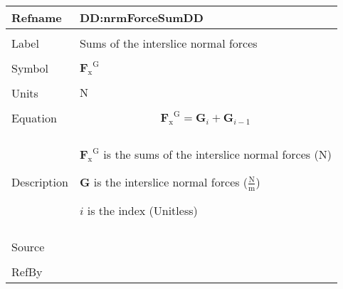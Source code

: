 \documentclass[12pt]{article}
\begin{document}
\vspace{\baselineskip}
\noindent
\begin{minipage}{\textwidth}
\begin{tabular}{>{\raggedright}p{}>{\raggedright\arraybackslash}p{}}
\toprule \textbf{Refname} & \textbf{DD:nrmForceSumDD}
\label{DD:nrmForceSumDD}
\\ \midrule \\
Label & Sums of the interslice normal forces
        
\\ \midrule \\
Symbol & ${{\symbf{F}_{\text{x}}}^{\text{G}}}$
         
\\ \midrule \\
Units & ${\text{N}}$
        
\\ \midrule \\
Equation & \begin{displaymath}
           {{\symbf{F}_{\text{x}}}^{\text{G}}}={\symbf{G}}_{i}+{\symbf{G}}_{i-1}
           \end{displaymath}
\\ \midrule \\
Description & \begin{symbDescription}
              \item{${{\symbf{F}_{\text{x}}}^{\text{G}}}$ is the sums of the interslice normal forces (${\text{N}}$)}
              \item{$\symbf{G}$ is the interslice normal forces ($\frac{\text{N}}{\text{m}}$)}
              \item{$i$ is the index (Unitless)}
              \end{symbDescription}
\\ \midrule \\
Source & \cite{fredlund1977}
         
\\ \midrule \\
RefBy & 
\\ \bottomrule
\end{tabular}
\end{minipage}
\end{document}
